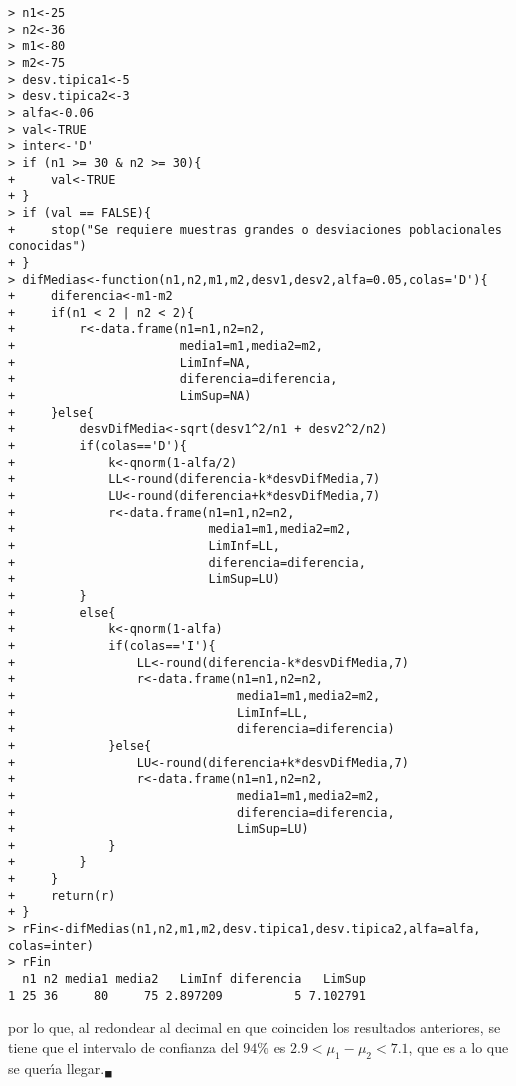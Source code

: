 \begin{solucion}
\begin{verbatim}
> n1<-25
> n2<-36
> m1<-80
> m2<-75
> desv.tipica1<-5
> desv.tipica2<-3
> alfa<-0.06
> val<-TRUE
> inter<-'D'
> if (n1 >= 30 & n2 >= 30){
+     val<-TRUE
+ }
> if (val == FALSE){
+     stop("Se requiere muestras grandes o desviaciones poblacionales conocidas")
+ }
> difMedias<-function(n1,n2,m1,m2,desv1,desv2,alfa=0.05,colas='D'){
+     diferencia<-m1-m2
+     if(n1 < 2 | n2 < 2){
+         r<-data.frame(n1=n1,n2=n2,
+                       media1=m1,media2=m2,
+                       LimInf=NA,
+                       diferencia=diferencia,
+                       LimSup=NA)
+     }else{
+         desvDifMedia<-sqrt(desv1^2/n1 + desv2^2/n2)
+         if(colas=='D'){
+             k<-qnorm(1-alfa/2)
+             LL<-round(diferencia-k*desvDifMedia,7)
+             LU<-round(diferencia+k*desvDifMedia,7)
+             r<-data.frame(n1=n1,n2=n2,
+                           media1=m1,media2=m2,
+                           LimInf=LL,
+                           diferencia=diferencia,
+                           LimSup=LU)
+         }
+         else{
+             k<-qnorm(1-alfa)
+             if(colas=='I'){
+                 LL<-round(diferencia-k*desvDifMedia,7)
+                 r<-data.frame(n1=n1,n2=n2,
+                               media1=m1,media2=m2,
+                               LimInf=LL,
+                               diferencia=diferencia)
+             }else{
+                 LU<-round(diferencia+k*desvDifMedia,7)
+                 r<-data.frame(n1=n1,n2=n2,
+                               media1=m1,media2=m2,
+                               diferencia=diferencia,
+                               LimSup=LU)
+             }
+         }
+     }
+     return(r)
+ }
> rFin<-difMedias(n1,n2,m1,m2,desv.tipica1,desv.tipica2,alfa=alfa, colas=inter)
> rFin
  n1 n2 media1 media2   LimInf diferencia   LimSup
1 25 36     80     75 2.897209          5 7.102791
 \end{verbatim}
 \vspace{-0.5cm}
 por lo que, al redondear al decimal en que coinciden los resultados anteriores, se tiene que el intervalo de confianza del $94\%$ es $2.9<\mu_1 - \mu_2< 7.1$, que es a lo que se quer\'{\i}a llegar.${}_{\blacksquare}$
\end{solucion}
